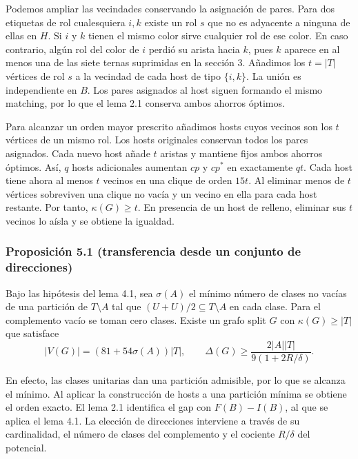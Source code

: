 \documentclass[spanish,11pt,a4paper]{article}
\begin{document}
Podemos ampliar las vecindades conservando la asignación de pares. Para dos etiquetas de rol cualesquiera \(i,k\) existe un rol \(s\) que no es adyacente a ninguna de ellas en \(H\). Si \(i\) y \(k\) tienen el mismo color sirve cualquier rol de ese color. En caso contrario, algún rol del color de \(i\) perdió su arista hacia \(k\), pues \(k\) aparece en al menos una de las siete ternas suprimidas en la sección 3. Añadimos los \(t=|T|\) vértices de rol \(s\) a la vecindad de cada host de tipo \(\{i,k\}\). La unión es independiente en \(B\). Los pares asignados al host siguen formando el mismo matching, por lo que el lema 2.1 conserva ambos ahorros óptimos.

Para alcanzar un orden mayor prescrito añadimos hosts cuyos vecinos son los \(t\) vértices de un mismo rol. Los hosts originales conservan todos los pares asignados. Cada nuevo host añade \(t\) aristas y mantiene fijos ambos ahorros óptimos. Así, \(q\) hosts adicionales aumentan \(cp\) y \(cp^*\) en exactamente \(qt\). Cada host tiene ahora al menos \(t\) vecinos en una clique de orden \(15t\). Al eliminar menos de \(t\) vértices sobreviven una clique no vacía y un vecino en ella para cada host restante. Por tanto, \(\kappa(G)\ge t\). En presencia de un host de relleno, eliminar sus \(t\) vecinos lo aísla y se obtiene la igualdad.

\subsubsection{Proposición 5.1 (transferencia desde un conjunto de direcciones)}\label{proposiciuxf3n-5.1-transferencia-desde-un-conjunto-de-direcciones}

Bajo las hipótesis del lema 4.1, sea \(\sigma(A)\) el mínimo número de clases no vacías de una partición de \(T\setminus A\) tal que \((U+U)/2\subseteq T\setminus A\) en cada clase. Para el complemento vacío se toman cero clases. Existe un grafo split \(G\) con \(\kappa(G)\ge|T|\) que satisface
\[|V(G)|=(81+54\sigma(A))|T|,\qquad
\Delta(G)\ge\frac{2|A||T|}{9(1+2R/\delta)}.\]

En efecto, las clases unitarias dan una partición admisible, por lo que se alcanza el mínimo. Al aplicar la construcción de hosts a una partición mínima se obtiene el orden exacto. El lema 2.1 identifica el gap con \(F(B)-I(B)\), al que se aplica el lema 4.1. La elección de direcciones interviene a través de su cardinalidad, el número de clases del complemento y el cociente \(R/\delta\) del potencial.
\end{document}
